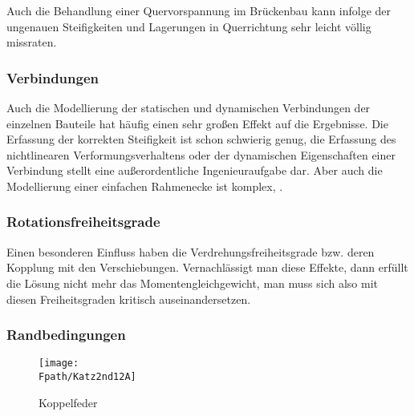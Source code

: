 Auch die Behandlung einer Quervorspannung im Br\"{u}ckenbau kann infolge der ungenauen Steifigkeiten und Lagerungen in Querrichtung sehr leicht v\"{o}llig missraten.

{\textcolor{sectionTitleBlue}{\subsubsection*{Verbindungen}}}

Auch die Modellierung der statischen und dynamischen Verbindungen der einzelnen Bauteile hat h\"{a}ufig einen sehr gro{\ss}en Effekt auf die Ergebnisse. Die Erfassung der korrekten Steifigkeit ist schon schwierig genug, die Erfassung des nichtlinearen Verformungsverhaltens oder der dynamischen Eigenschaften einer Verbindung stellt eine au{\ss}erordentliche Ingenieuraufgabe dar. Aber auch die Modellierung einer einfachen Rahmenecke ist komplex, \cite{Rombach}.

{\textcolor{sectionTitleBlue}{\subsubsection*{Rotationsfreiheitsgrade}}}

Einen besonderen Einfluss haben die Verdrehungsfreiheitsgrade bzw. deren Kopplung mit den Verschiebungen. Vernachl\"{a}ssigt man diese Effekte, dann erf\"{u}llt die L\"{o}sung nicht mehr das Momentengleichgewicht, man muss sich also mit diesen Freiheitsgraden kritisch auseinandersetzen.

{\textcolor{sectionTitleBlue}{\subsubsection*{Randbedingungen}}}
\begin{figure}[tbp] \centering
\centering
\if {} \sidecaption[t] \fi
\texttt{[image: \\Fpath/Katz2nd12A]}
\caption{Koppelfeder} \label{Katz2nd12}
\end{figure}%

